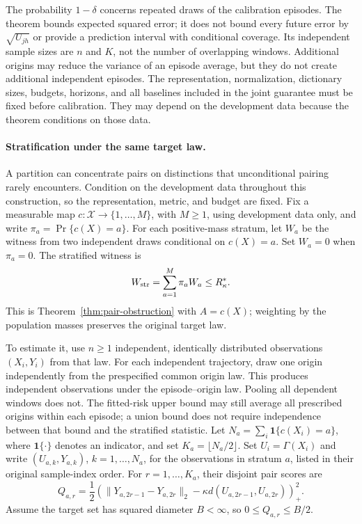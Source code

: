The probability $1-\delta$ concerns repeated draws of the calibration
episodes. The theorem bounds expected squared error; it does not bound
every future error by $\sqrt{U_{jh}}$ or provide a prediction interval
with conditional coverage. Its independent sample sizes are $n$ and $K$,
not the number of overlapping windows. Additional origins may reduce the
variance of an episode average, but they do not create additional
independent episodes. The representation, normalization, dictionary sizes,
budgets, horizons, and all baselines included in the joint guarantee must
be fixed before calibration. They may depend on the development data
because the theorem conditions on those data.

\paragraph{Stratification under the same target law.}
A partition can concentrate pairs on distinctions that unconditional pairing
rarely encounters. Condition on the development data throughout this
construction, so the representation, metric, and budget are fixed.
Fix a measurable map
$c:\mathcal X\to\{1,\ldots,M\}$, with $M\geq1$, using development
data only, and write
$\pi_a=\Pr\{c(X)=a\}$. For each positive-mass stratum, let $W_a$ be
the witness from two independent draws conditional on $c(X)=a$.
Set $W_a=0$ when $\pi_a=0$. The stratified witness is
\begin{equation}
 W_{\rm str}=\sum_{a=1}^M\pi_a W_a\leq R^*_\kappa.
 \label{eq:stratified-witness}
\end{equation}
This is Theorem~\ref{thm:pair-obstruction} with $A=c(X)$; weighting by
the population masses preserves the original target law.

To estimate it, use $n\geq1$ independent, identically distributed observations
$(X_i,Y_i)$ from that law.
For each independent trajectory, draw one origin independently from the
prespecified common origin law. This produces independent observations under
the episode--origin law. Pooling all
dependent windows does not. The fitted-risk upper bound may still average
all prescribed origins within each episode; a union bound does not require
independence between that bound and the stratified statistic.
Let $N_a=\sum_i\mathbf1\{c(X_i)=a\}$, where $\mathbf1\{\cdot\}$
denotes an indicator, and set $K_a=\lfloor N_a/2\rfloor$.
Set $U_i=\Gamma(X_i)$ and write $(U_{a,k},Y_{a,k})$,
$k=1,\ldots,N_a$, for the observations in stratum $a$, listed in their
original sample-index order. For $r=1,\ldots,K_a$, their disjoint pair
scores are
\[
 Q_{a,r}=\frac12\left(\|Y_{a,2r-1}-Y_{a,2r}\|_2
      -\kappa d(U_{a,2r-1},U_{a,2r})\right)_+^2.
\]
Assume the target set has squared diameter $B<\infty$, so
$0\leq Q_{a,r}\leq B/2$.

